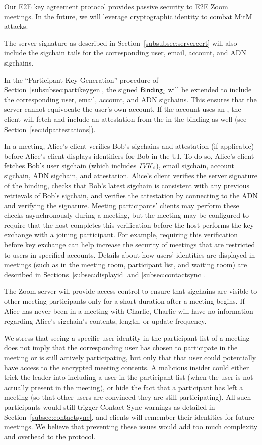 Our E2E key agreement protocol provides passive security to E2E Zoom meetings. In the future, we
will leverage cryptographic identity to combat MitM attacks.

The server signature as described in Section~\ref{subsubsec:servercert} will also include the
sigchain tails for the corresponding user, email, account, and ADN sigchains.

In the ``Participant Key Generation'' procedure of Section~\ref{subsubsec:partikeygen}, the signed
${\sf Binding}_i$ will be extended to include the corresponding user, email, account, and ADN sigchains.
This ensures that the server cannot equivocate the user's own account. If the account uses an \idp,
the client will fetch and include an attestation from the \idp in the binding as well (see
Section~\ref{sec:idpattestations}).

In a meeting, Alice's client verifies Bob's sigchains and \idp attestation (if applicable) before
Alice's client displays identifiers for Bob in the UI. To do so, Alice's client fetches Bob's user
sigchain (which includes $\mathit{IVK}_i$), email sigchain, account sigchain, ADN sigchain, and \idp
attestation. Alice's client verifies the server signature of the binding, checks that Bob's latest
sigchain is consistent with any previous retrievals of Bob's sigchain, and verifies the \idp
attestation by connecting to the ADN and verifying the \idp signature. Meeting participants' clients
may perform these checks asynchronously during a meeting, but the meeting may be configured to
require that the host completes this verification before the host performs the key exchange with a
joining participant. For example, requiring this verification before key exchange can help increase
the security of meetings that are restricted to users in specified accounts. Details about how
users' identities are displayed in meetings (such as in the meeting room, participant list, and
waiting room) are described in Sections~\ref{subsec:displayid} and \ref{subsec:contactsync}.

The Zoom server will provide access control to ensure that sigchains are visible to other meeting
participants only for a short duration after a meeting begins. If Alice has never been in a meeting
with Charlie, Charlie will have no information regarding Alice's sigchain's contents, length, or
update frequency.

We stress that seeing a specific user identity in the participant list of a meeting does not imply
that the corresponding user has chosen to participate in the meeting or is still actively
participating, but only that that user could potentially have access to the encrypted meeting
contents. A malicious insider could either trick the leader into including a user in the participant
list (when the user is not actually present in the meeting), or hide the fact that a participant has
left a meeting (so that other users are convinced they are still participating). All such
participants would still trigger Contact Sync warnings as detailed in
Section~\ref{subsec:contactsync}, and clients will remember their identities for future meetings. We
believe that preventing these issues would add too much complexity and overhead to the protocol.

